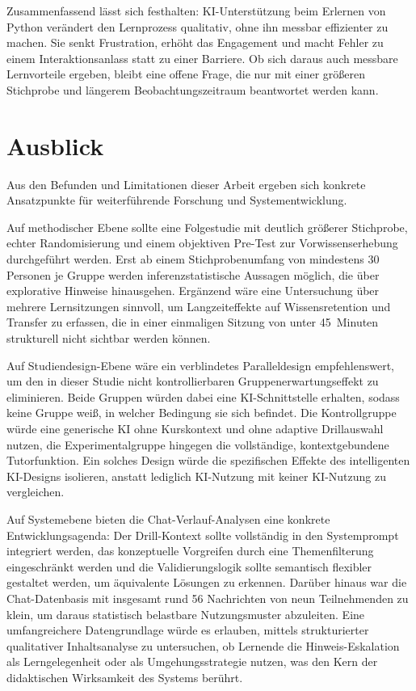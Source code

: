 Zusammenfassend lässt sich festhalten: KI-Unterstützung beim Erlernen von Python verändert den Lernprozess qualitativ, ohne ihn messbar effizienter zu machen. Sie senkt Frustration, erhöht das Engagement und macht Fehler zu einem Interaktionsanlass statt zu einer Barriere. Ob sich daraus auch messbare Lernvorteile ergeben, bleibt eine offene Frage, die nur mit einer größeren Stichprobe und längerem Beobachtungszeitraum beantwortet werden kann.


\section{Ausblick}\label{sec:ausblick}

Aus den Befunden und Limitationen dieser Arbeit ergeben sich konkrete Ansatzpunkte für weiterführende Forschung und Systementwicklung.

Auf methodischer Ebene sollte eine Folgestudie mit deutlich größerer Stichprobe, echter Randomisierung und einem objektiven Pre-Test zur Vorwissenserhebung durchgeführt werden. Erst ab einem Stichprobenumfang von mindestens 30 Personen je Gruppe werden inferenzstatistische Aussagen möglich, die über explorative Hinweise hinausgehen. Ergänzend wäre eine Untersuchung über mehrere Lernsitzungen sinnvoll, um Langzeiteffekte auf Wissensretention und Transfer zu erfassen, die in einer einmaligen Sitzung von unter 45~Minuten strukturell nicht sichtbar werden können.

Auf Studiendesign-Ebene wäre ein verblindetes Paralleldesign empfehlenswert, um den in dieser Studie nicht kontrollierbaren Gruppenerwartungseffekt zu eliminieren. Beide Gruppen würden dabei eine KI-Schnittstelle erhalten, sodass keine Gruppe weiß, in welcher Bedingung sie sich befindet. Die Kontrollgruppe würde eine generische KI ohne Kurskontext und ohne adaptive Drillauswahl nutzen, die Experimentalgruppe hingegen die vollständige, kontextgebundene Tutorfunktion. Ein solches Design würde die spezifischen Effekte des intelligenten KI-Designs isolieren, anstatt lediglich KI-Nutzung mit keiner KI-Nutzung zu vergleichen.

Auf Systemebene bieten die Chat-Verlauf-Analysen eine konkrete Entwicklungsagenda: Der Drill-Kontext sollte vollständig in den Systemprompt integriert werden, das konzeptuelle Vorgreifen durch eine Themenfilterung eingeschränkt werden und die Validierungslogik sollte semantisch flexibler gestaltet werden, um äquivalente Lösungen zu erkennen. Darüber hinaus war die Chat-Datenbasis mit insgesamt rund 56 Nachrichten von neun Teilnehmenden zu klein, um daraus statistisch belastbare Nutzungsmuster abzuleiten. Eine umfangreichere Datengrundlage würde es erlauben, mittels strukturierter qualitativer Inhaltsanalyse zu untersuchen, ob Lernende die Hinweis-Eskalation als Lerngelegenheit oder als Umgehungsstrategie nutzen, was den Kern der didaktischen Wirksamkeit des Systems berührt.

